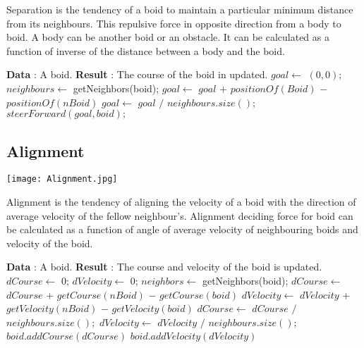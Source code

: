 \documentclass{article}
\begin{document}
\vspace{3mm}
Separation is the tendency of a boid to maintain a particular minimum distance from its neighbours.
This repulsive force in opposite direction from a body to boid. A body can be another boid or an obstacle. It can be calculated as a function of inverse of the distance between a body and the boid.

\begin{algorithm}
\begin{algorithmic}
\State \textbf{Data} : A boid.
\State \textbf{Result} : The course of the boid in updated.
 \State $goal \gets$ $(0,0);$
 \State $neighbours\gets$ getNeighbors(boid);
         \State $goal \gets$ $goal$ $+$ $positionOf(Boid)$ $-$ $positionOf(nBoid)$   
        \EndFor 
           \State $goal \gets$ $goal$ $/$ $neighbours.size();$
              \State $steerForward(goal, boid);$ 
\end{algorithmic}
\end{algorithm}

\subsection{Alignment}

\vspace{3mm}
\begin{center}
\texttt{[image: Alignment.jpg]}
\end{center}

\vspace{3mm}
Alignment is the tendency of aligning the velocity of a boid with the direction
of average velocity of the fellow neighbour’s.
Alignment deciding force for boid can be calculated as a function of angle of
average velocity of neighbouring boids and velocity of the boid.

\begin{algorithm}
\begin{algorithmic}
\State \textbf{Data} : A boid.
\State \textbf{Result} : The course and velocity of the boid is updated.
 \State $dCourse \gets$ 0;
 \State $dVelocity \gets$ 0;
 \State $neighbors \gets$ getNeighbors(boid);
         \State $dCourse \gets$ $dCourse$ $+$ $getCourse(nBoid)$ $-$ $getCourse(boid)$
          \State $dVelocity \gets$ $dVelocity$ $+$ $getVelocity(nBoid)$ $-$ $getVelocity(boid)$
        \EndFor 
           \State $dCourse \gets$ $dCourse$ $/$ $neighbours.size();$
            \State $dVelocity \gets$ $dVelocity$ $/$ $neighbours.size();$
              \State $boid.addCourse(dCourse)$
              \State $boid.addVelocity(dVelocity)$
\end{algorithmic}
\end{algorithm}
\end{document}
